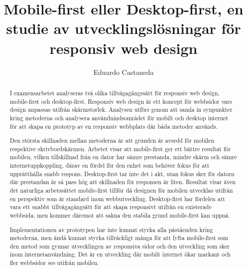 \documentclass[11pt]{article}
\title{Mobile-first eller Desktop-first, en studie av utvecklingslösningar för responsiv web design}
\author{Eduardo Castaneda}
\begin{document}
\maketitle
\thispagestyle{empty}


\newpage

\begin{abstract}

I examensarbetet analyseras två olika tillvägagångssätt för responsiv web design, mobile-first och desktop-first. Responsiv web design är ett koncept för webbsidor vars design anpassas utifrån skärmstorlek. Analysen utförs genom att samla in synpunkter kring metoderna och analysera användnindsområdet för mobilt och desktop internet för att skapa en prototyp av en responsiv webbplats där båda metoder används.

Den största skillnaden mellan metoderna är att grunden är avsedd för mobilen respektive skrivbordskärmen. Arbetet visar att mobile-first ger ett bättre resultat för mobilen, vilken tillskillnad från en dator har sämre prestanda, mindre skärm och sämre internetuppkoppling,
därav en fördel för den enhet som behöver fokus för att upprätthålla snabb respons. Desktop-first tar inte det i akt, utan fokus sker för datorn där prestandan är så pass hög att skillnaden för responsen är liten. Resultat visar även det naturliga arbetssättet mobile-first tillför då designen för mobilen utvecklas utifrån en perspektiv som är standard inom webbutveckling. Desktop-first har fördelen att vara ett snabbt tillvägagångsätt för att skapa responsivt utifrån en existerade webbsida, men kommer däremot att sakna den stabila grund mobile-first kan uppnå.

Implementationen av prototypen har inte kunnat styrka alla påståenden kring metoderna, men ändå kunnat styrka tillräckligt många för att lyfta mobile-first som den metod som gynnar utvecklingen av responsiva sidor och den utveckling som sker inom internetanvändning. Det är en utveckling där mobilt internet ökar markant och fler webbsidor ses utifrån mobilen. 



\end{abstract}
\thispagestyle{empty}

\newpage
\tableofcontents
\newpage
\end{document}
